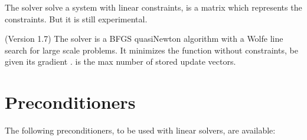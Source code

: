 \documentclass[a4paper,11pt,english]{sphinxmanual}
\begin{document}
\sphinxAtStartPar
The solver  solve a system with linear constraints,  is a matrix which represents the constraints. But it is still experimental.

\sphinxAtStartPar
(Version 1.7) The solver  is a BFGS quasi\sphinxhyphen{}Newton algorithm with a Wolfe line search for large scale problems. It minimizes the function  without constraints, be given its gradient .  is the max number of stored update vectors.


\section{Preconditioners}
\label{\detokenize{gmm/iter:preconditioners}}
\sphinxAtStartPar
The following preconditioners, to be used with linear solvers, are available:
\end{document}
